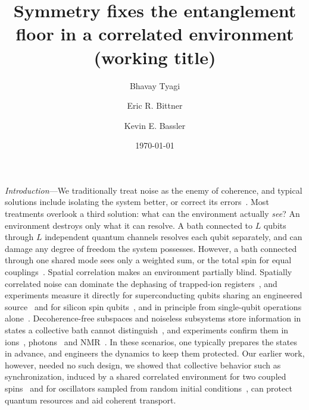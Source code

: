 \documentclass[aps,prl,reprint,amsmath,amssymb,floatfix]{revtex4-2}
\begin{document}
\title{Symmetry fixes the entanglement floor in a correlated environment (working title)}

\author{Bhavay Tyagi}
\author{Eric R. Bittner}
\author{Kevin E. Bassler}
\date{\today}

\begin{abstract}
\end{abstract}

\maketitle

{\it Introduction}---We traditionally treat noise as the enemy of coherence, and typical solutions include isolating
the system better, or correct its errors~\cite{Acharya2023}. Most treatments overlook a third solution: what can
the environment actually \emph{see}? An environment destroys only what it can resolve. A bath connected to $L$ qubits through $L$
independent quantum channels resolves each qubit separately, and can damage any degree
of freedom the system possesses. However, a bath connected through one shared mode
sees only a weighted sum, or the total spin for equal couplings~\cite{Blais2021}. Spatial correlation makes an environment partially blind. Spatially correlated noise can dominate the dephasing
of trapped-ion registers~\cite{Kielpinski2001,Langer2005,Monz2011,Dasu2025},
and experiments measure it directly for superconducting
qubits sharing an engineered source~\cite{vonLupke2020} and for silicon spin
qubits~\cite{Yoneda2023}, and in principle from single-qubit operations
alone~\cite{Gulacsi2025}. Decoherence-free subspaces and noiseless subsystems
store information in states a collective bath cannot
distinguish~\cite{Zanardi1997,Lidar1998,Knill2000}, and
experiments confirm them in ions~\cite{Kielpinski2001,Langer2005},
photons~\cite{Kwiat2000} and NMR~\cite{Viola2001}. In these scenarios, one typically prepares the states in advance, and engineers the dynamics to keep them protected. Our earlier work, however, needed no such design, we
showed that collective behavior such as synchronization, induced by a shared correlated environment for two coupled
spins~\cite{Tyagi2024} and for oscillators sampled from random initial
conditions~\cite{Bittner2025jcp}, can protect quantum resources and aid coherent transport.
\end{document}
